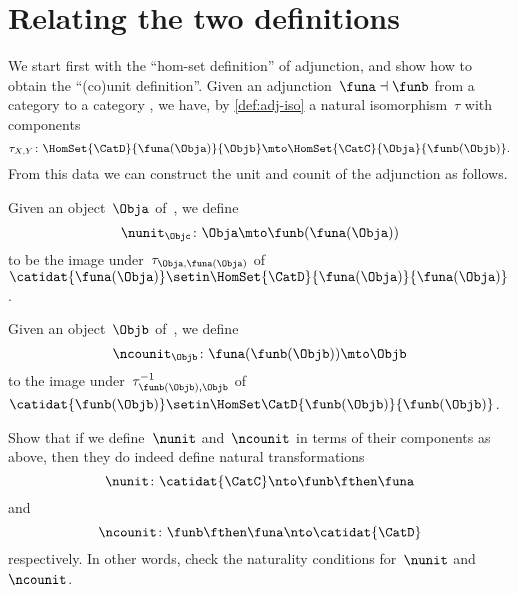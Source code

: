 
\section{Relating the two definitions}
\label{relate-adj-defs}

We start first with the ``hom-set definition'' of adjunction, and show how to obtain the ``(co)unit definition''.
Given an adjunction~$\funa \dashv \funb$ from a category \CatC to a category \CatD, we have, by \cref{def:adj-iso} a natural isomorphism~$\tau$ with components
\begin{equation}
    \tau_{X,Y} \colon \HomSet{\CatD}{\funa(\Obja)}{\Objb} \mto \HomSet{\CatC}{\Obja}{\funb(\Objb)}.
\end{equation}
From this data we can construct the unit and counit of the adjunction as follows.

Given an object~$\Obja$ of~\CatC, we define
%
\begin{equation}
    \nunit_\Objc \colon \Obja \mto \funb(\funa(\Obja))
\end{equation}
%
to be the image under~$\tau_{\Obja, \funa(\Obja)}$ of~$\catidat{\funa(\Obja)} \setin \HomSet{\CatD}{\funa (\Obja)}{\funa(\Obja)}$.

Given an object~$\Objb$ of~\CatD, we define
\begin{equation}
    \ncounit_\Objb \colon \funa(\funb(\Objb)) \mto \Objb
\end{equation}
to the image under~$\tau_{\funb(\Objb), \Objb}^{-1}$ of~$\catidat{\funb(\Objb)} \setin \HomSet\CatD{\funb(\Objb)}{\funb(\Objb)}$.

\begin{exercise}
    \label{ex:eta-epsilon}

    Show that if we define~$\nunit$ and~$\ncounit$ in terms of their components as above, then they do indeed define natural transformations
    \begin{equation}
        \nunit\colon \catidat{\CatC} \nto \funb\fthen \funa
    \end{equation}
    and
    \begin{equation}
        \ncounit\colon \funb \fthen \funa \nto \catidat{\CatD}
    \end{equation}
    respectively.
    In other words, check the naturality conditions for~$\nunit$ and~$\ncounit$.
\end{exercise}

